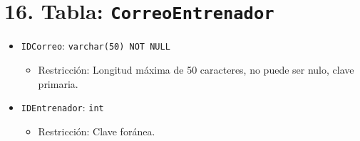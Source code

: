 \section*{16. Tabla: \texttt{CorreoEntrenador}}
\begin{itemize}
    \item \texttt{IDCorreo}: \texttt{varchar(50) NOT NULL}
    \begin{itemize}
        \item Restricción: Longitud máxima de 50 caracteres, no puede ser nulo, clave primaria.
    \end{itemize}
    \item \texttt{IDEntrenador}: \texttt{int}
    \begin{itemize}
        \item Restricción: Clave foránea.
    \end{itemize}
\end{itemize}

